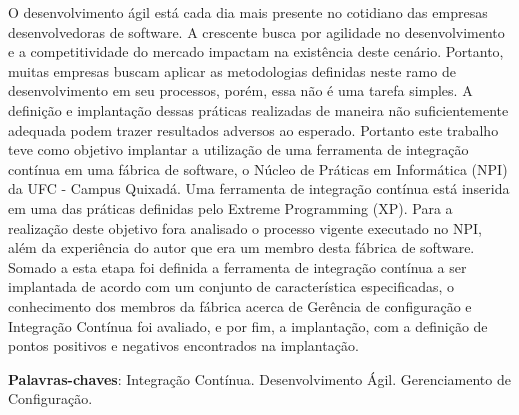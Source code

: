 \setlength{\absparsep}{18pt} %
\begin{resumo}
 
O desenvolvimento ágil está cada dia mais presente no cotidiano das empresas desenvolvedoras de software. A crescente busca por agilidade no desenvolvimento e a competitividade do mercado impactam na existência deste cenário. Portanto, muitas empresas buscam aplicar as metodologias definidas neste ramo de desenvolvimento em seu processos, porém, essa não é uma tarefa simples. A definição e implantação dessas práticas realizadas de maneira não suficientemente adequada podem trazer resultados adversos ao esperado. Portanto este trabalho teve como objetivo implantar a utilização de uma ferramenta de integração contínua em uma fábrica de software, o Núcleo de Práticas em Informática (NPI) da UFC - Campus Quixadá. Uma ferramenta de integração contínua está inserida em uma das práticas definidas pelo Extreme Programming (XP). Para a realização deste objetivo fora analisado o processo vigente executado no NPI, além da experiência do autor que era um membro desta fábrica de software. Somado a esta etapa foi definida a ferramenta de integração contínua a ser implantada de acordo com um conjunto de característica especificadas, o conhecimento dos membros da fábrica acerca de Gerência de configuração e Integração Contínua foi avaliado, e por fim, a implantação, com a definição de pontos positivos e negativos encontrados na implantação.


 \textbf{Palavras-chaves}: Integração Contínua. Desenvolvimento Ágil. Gerenciamento de Configuração.
\end{resumo}